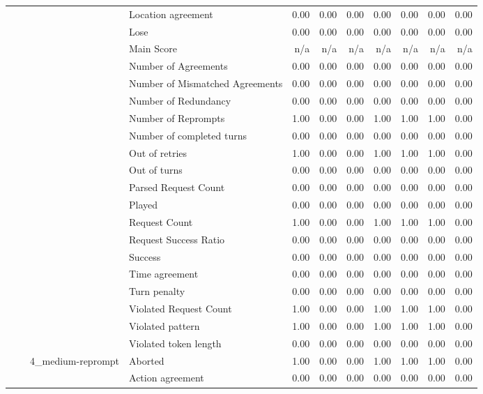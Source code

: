 \begin{tabular}{llllrrrrrrr}
 &  &  & Location agreement & 0.00 & 0.00 & 0.00 & 0.00 & 0.00 & 0.00 & 0.00 \\
 &  &  & Lose & 0.00 & 0.00 & 0.00 & 0.00 & 0.00 & 0.00 & 0.00 \\
 &  &  & Main Score & n/a & n/a & n/a & n/a & n/a & n/a & n/a \\
 &  &  & Number of Agreements & 0.00 & 0.00 & 0.00 & 0.00 & 0.00 & 0.00 & 0.00 \\
 &  &  & Number of Mismatched Agreements & 0.00 & 0.00 & 0.00 & 0.00 & 0.00 & 0.00 & 0.00 \\
 &  &  & Number of Redundancy & 0.00 & 0.00 & 0.00 & 0.00 & 0.00 & 0.00 & 0.00 \\
 &  &  & Number of Reprompts & 1.00 & 0.00 & 0.00 & 1.00 & 1.00 & 1.00 & 0.00 \\
 &  &  & Number of completed turns & 0.00 & 0.00 & 0.00 & 0.00 & 0.00 & 0.00 & 0.00 \\
 &  &  & Out of retries & 1.00 & 0.00 & 0.00 & 1.00 & 1.00 & 1.00 & 0.00 \\
 &  &  & Out of turns & 0.00 & 0.00 & 0.00 & 0.00 & 0.00 & 0.00 & 0.00 \\
 &  &  & Parsed Request Count & 0.00 & 0.00 & 0.00 & 0.00 & 0.00 & 0.00 & 0.00 \\
 &  &  & Played & 0.00 & 0.00 & 0.00 & 0.00 & 0.00 & 0.00 & 0.00 \\
 &  &  & Request Count & 1.00 & 0.00 & 0.00 & 1.00 & 1.00 & 1.00 & 0.00 \\
 &  &  & Request Success Ratio & 0.00 & 0.00 & 0.00 & 0.00 & 0.00 & 0.00 & 0.00 \\
 &  &  & Success & 0.00 & 0.00 & 0.00 & 0.00 & 0.00 & 0.00 & 0.00 \\
 &  &  & Time agreement & 0.00 & 0.00 & 0.00 & 0.00 & 0.00 & 0.00 & 0.00 \\
 &  &  & Turn penalty & 0.00 & 0.00 & 0.00 & 0.00 & 0.00 & 0.00 & 0.00 \\
 &  &  & Violated Request Count & 1.00 & 0.00 & 0.00 & 1.00 & 1.00 & 1.00 & 0.00 \\
 &  &  & Violated pattern & 1.00 & 0.00 & 0.00 & 1.00 & 1.00 & 1.00 & 0.00 \\
 &  &  & Violated token length & 0.00 & 0.00 & 0.00 & 0.00 & 0.00 & 0.00 & 0.00 \\
\cline{3-11}
 &  & \multirow[t]{27}{*}{4_medium-reprompt} & Aborted & 1.00 & 0.00 & 0.00 & 1.00 & 1.00 & 1.00 & 0.00 \\
 &  &  & Action agreement & 0.00 & 0.00 & 0.00 & 0.00 & 0.00 & 0.00 & 0.00 \\

\end{tabular}

